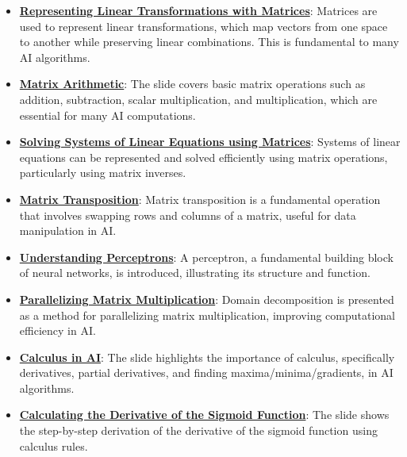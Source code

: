 \documentclass{article}%
\begin{document}
\begin{itemize}[leftmargin=*]%
\item \href{https://www.math.purdue.edu/~yipn/351/04L1-Linear Algebra Primer.pdf#page=5}{\textbf{Representing Linear Transformations with Matrices}}: Matrices are used to represent linear transformations, which map vectors from one space to another while preserving linear combinations. This is fundamental to many AI algorithms.%
\item \href{https://www.math.purdue.edu/~yipn/351/04L1-Linear Algebra Primer.pdf#page=9}{\textbf{Matrix Arithmetic}}: The slide covers basic matrix operations such as addition, subtraction, scalar multiplication, and multiplication, which are essential for many AI computations.%
\item \href{https://www.math.purdue.edu/~yipn/351/04L1-Linear Algebra Primer.pdf#page=11}{\textbf{Solving Systems of Linear Equations using Matrices}}: Systems of linear equations can be represented and solved efficiently using matrix operations, particularly using matrix inverses.%
\item \href{https://www.math.purdue.edu/~yipn/351/04L1-Linear Algebra Primer.pdf#page=16}{\textbf{Matrix Transposition}}: Matrix transposition is a fundamental operation that involves swapping rows and columns of a matrix, useful for data manipulation in AI.%
\item \href{https://www.math.purdue.edu/~yipn/351/04L1-Linear Algebra Primer.pdf#page=17}{\textbf{Understanding Perceptrons}}: A perceptron, a fundamental building block of neural networks, is introduced, illustrating its structure and function.%
\item \href{https://www.math.purdue.edu/~yipn/351/04L1-Linear Algebra Primer.pdf#page=18}{\textbf{Parallelizing Matrix Multiplication}}: Domain decomposition is presented as a method for parallelizing matrix multiplication, improving computational efficiency in AI.%
\item \href{https://www.math.purdue.edu/~yipn/351/04L1-Linear Algebra Primer.pdf#page=19}{\textbf{Calculus in AI}}: The slide highlights the importance of calculus, specifically derivatives, partial derivatives, and finding maxima/minima/gradients, in AI algorithms.%
\item \href{https://www.math.purdue.edu/~yipn/351/04L1-Linear Algebra Primer.pdf#page=21}{\textbf{Calculating the Derivative of the Sigmoid Function}}: The slide shows the step-by-step derivation of the derivative of the sigmoid function using calculus rules.%
\end{itemize}%
\end{document}
